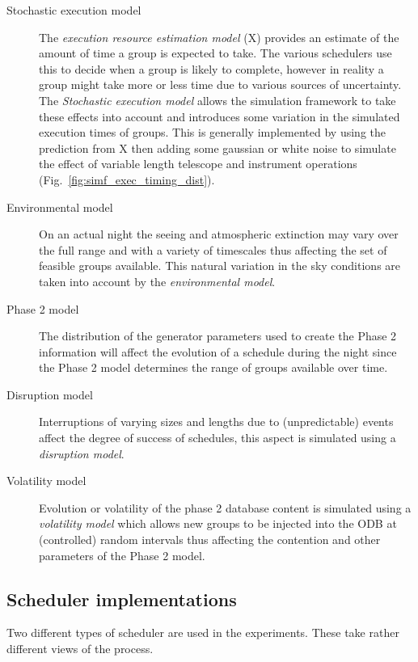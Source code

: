 \begin{description}
\item [Stochastic execution model] The \emph{execution resource estimation model} (X) provides an estimate of the amount of time a group is expected to take. The various schedulers use this to decide when a group is likely to complete, however in reality a group might take more or less time due to various sources of uncertainty. The \emph{Stochastic execution model} allows the simulation framework to take these effects into account and introduces some variation in the simulated execution times of groups. This is generally implemented by using the prediction from X then adding some gaussian or white noise to simulate the effect of variable length telescope and instrument operations (Fig.~\ref{fig:simf_exec_timing_dist}).

\item [Environmental model] On an actual night the seeing and atmospheric extinction may vary over the full range and with a variety of timescales thus affecting the set of feasible groups available. This natural variation in the sky conditions are taken into account by the \emph{environmental model}.

\item [Phase 2 model] The distribution of the generator parameters used to create the Phase 2 information will affect the evolution of a schedule during the night since the Phase 2 model determines the range of groups available over time.

\item [Disruption model] Interruptions of varying sizes and lengths due to (unpredictable) events affect the degree of success of schedules, this aspect is simulated using a \emph{disruption model}.

\item [Volatility model] Evolution or volatility of the phase 2 database content is simulated using a \emph{volatility model} which allows new groups to be injected into the ODB at (controlled) random intervals thus affecting the contention and other parameters of the Phase 2 model.

\end{description}


\subsection{Scheduler implementations}
\label{ss:sched_impl}
Two different types of scheduler are used in the experiments. These take rather different views of the process.

